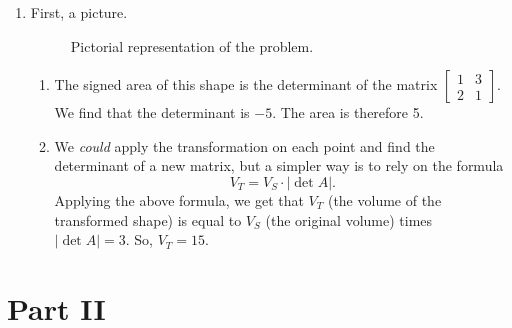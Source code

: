 \begin{enumerate}
	\item First, a picture.
		\begin{figure}[!h]
			\centering
			\caption{Pictorial representation of the problem.}
		\end{figure}
		\begin{enumerate}
			\item The signed area of this shape is the determinant of the matrix \(\begin{bmatrix}1 & 3 \\ 2 & 1\end{bmatrix}\). We find that the
			 	 determinant is \(-5\). The area is therefore 5.
			\item We \emph{could} apply the transformation on each point and find the determinant of a new matrix, but a simpler way is to rely on the formula
				\[V_T = V_S \cdot \lvert \det A \rvert.\]
				Applying the above formula, we get that \(V_T\) (the volume of the transformed shape) is equal to \(V_S\) (the original volume) times
				\(\lvert \det A \rvert = 3.\) So, \(V_T = 15\).
		\end{enumerate}
\end{enumerate}

\section{Part II}
